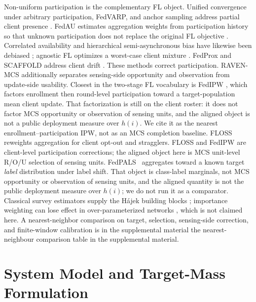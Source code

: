 \documentclass[letterpaper,journal]{IEEEtran}
\begin{document}
Non-uniform participation is the complementary FL object.  Unified
convergence under arbitrary participation, FedVARP, and anchor sampling
address partial client presence
\cite{wang2022unified,jhunjhunwala2022fedvarp,wu2023anchor}.
FedAU estimates aggregation weights from participation history so that
unknown participation does not replace the original FL objective
\cite{wang2024lightweight}.  Correlated availability and hierarchical
semi-asynchronous bias have likewise been debiased
\cite{sun2025debiasing,chen2026fedcure}; agnostic FL optimizes a worst-case
client mixture \cite{mohri2019agnostic}.  FedProx and SCAFFOLD address
client drift \cite{li2020fedprox,karimireddy2020scaffold}.  These methods
correct participation.  RAVEN-MCS additionally separates sensing-side
opportunity and observation from update-side usability.
Closest in the two-stage FL vocabulary is FedIPW
\cite{morishita2026who}, which factors enrollment then round-level
participation toward a target-population mean client update.  That
factorization is still on the client roster: it does not factor MCS
opportunity or observation of sensing units, and the aligned object is not
a public deployment measure over $h(i)$.  We cite it as the nearest
enrollment--participation IPW, not as an MCS completion baseline.
FLOSS~\cite{goetze2025floss} reweights aggregation for client opt-out and
stragglers.  FLOSS and FedIPW are client-level participation corrections;
the aligned object here is MCS unit-level R/O/U selection of sensing units.
FedPALS~\cite{listozec2024overcoming} aggregates toward a known target
\emph{label} distribution under label shift.  That object is class-label
marginals, not MCS opportunity or observation of sensing units, and the
aligned quantity is not the public deployment measure over $h(i)$; we do
not run it as a comparator.
Classical survey estimators supply the H\'ajek building blocks
\cite{horvitz1952generalization,hajek1971comment,shimodaira2000covariate,robins1994estimation};
importance weighting can lose effect in over-parameterized networks
\cite{byrd2019importance}, which is not claimed here.
A nearest-neighbor comparison on target, selection, sensing-side
correction, and finite-window calibration is in the supplemental material
the nearest-neighbour comparison table in the supplemental material.


\section{System Model and Target-Mass Formulation}
\label{sec:system_model}
\end{document}
